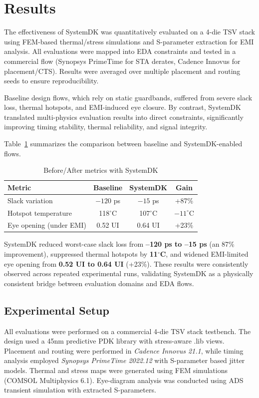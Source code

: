 \documentclass[conference]{IEEEtran}
\begin{document}
\section{Results}
The effectiveness of SystemDK was quantitatively evaluated on a 4-die TSV stack
using FEM-based thermal/stress simulations and S-parameter extraction for EMI analysis.
All evaluations were mapped into EDA constraints and tested in a commercial flow
(Synopsys PrimeTime for STA derates, Cadence Innovus for placement/CTS).
Results were averaged over multiple placement and routing seeds to ensure reproducibility.

Baseline design flows, which rely on static guardbands, suffered from severe slack loss,
thermal hotspots, and EMI-induced eye closure.
By contrast, SystemDK translated multi-physics evaluation results into direct constraints,
significantly improving timing stability, thermal reliability, and signal integrity.

Table~\ref{tab:results} summarizes the comparison between baseline and SystemDK-enabled flows.

\begin{table}[htbp]
\centering
\caption{Before/After metrics with SystemDK}
\label{tab:results}
\setlength{\tabcolsep}{6pt}
\renewcommand{\arraystretch}{1.25}
\footnotesize
\begin{tabular}{|l|c|c|c|}
\hline
\textbf{Metric} & \textbf{Baseline} & \textbf{SystemDK} & \textbf{Gain} \\
\hline
Slack variation & $-120$ ps & $-15$ ps & +87\% \\
Hotspot temperature & 118$^\circ$C & 107$^\circ$C & $-11^\circ$C \\
Eye opening (under EMI) & 0.52 UI & 0.64 UI & +23\% \\
\hline
\end{tabular}
\end{table}

SystemDK reduced worst-case slack loss from \textbf{--120 ps to --15 ps} (an 87\% improvement),
suppressed thermal hotspots by \textbf{11$^\circ$C}, and widened EMI-limited eye opening
from \textbf{0.52 UI to 0.64 UI} (+23\%).
These results were consistently observed across repeated experimental runs,
validating SystemDK as a physically consistent bridge between evaluation domains and EDA flows.

\subsection*{Experimental Setup}
All evaluations were performed on a commercial 4-die TSV stack testbench.  
The design used a 45nm predictive PDK library with stress-aware .lib views.  
Placement and routing were performed in \textit{Cadence Innovus 21.1},  
while timing analysis employed \textit{Synopsys PrimeTime 2022.12} with S-parameter based jitter models.  
Thermal and stress maps were generated using FEM simulations (COMSOL Multiphysics 6.1).  
Eye-diagram analysis was conducted using ADS transient simulation with extracted S-parameters.  
\end{document}
